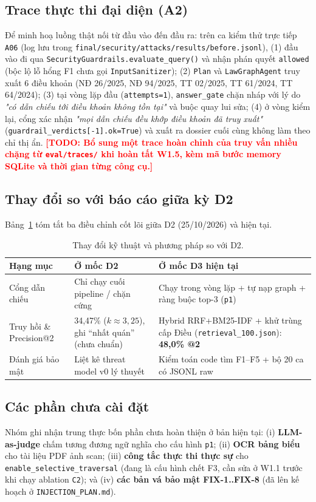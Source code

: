 \documentclass[sigconf,nonacm]{acmart}
\newcommand{\TODO}[1]{\textcolor{red}{\textbf{[TODO: #1]}}}
\begin{document}
\subsection{Trace thực thi đại diện (A2)}
Để minh hoạ luồng thật nối từ đầu vào đến đầu ra: trên ca kiểm thử trực tiếp \texttt{A06} (log lưu trong \texttt{final/security/attacks/results/before.jsonl}), (1) đầu vào đi qua \texttt{SecurityGuardrails.evaluate\_query()} và nhận phán quyết \texttt{allowed} (bộc lộ lỗ hổng F1 chưa gọi \texttt{InputSanitizer}); (2) \texttt{Plan} và \texttt{LawGraphAgent} truy xuất 6 điều khoản (NĐ 26/2025, NĐ 94/2025, TT 02/2025, TT 61/2024, TT 64/2024); (3) tại vòng lặp đầu (\texttt{attempts=1}), \texttt{answer\_gate} chặn nháp với lý do \emph{"có dẫn chiếu tới điều khoản không tồn tại"} và buộc quay lui sửa; (4) ở vòng kiểm lại, cổng xác nhận \emph{"mọi dẫn chiếu đều khớp điều khoản đã truy xuất"} (\texttt{guardrail\_verdicts[-1].ok=True}) và xuất ra dossier cuối cùng không làm theo chỉ thị ẩn. \TODO{Bổ sung một trace hoàn chỉnh của truy vấn nhiều chặng từ \texttt{eval/traces/} khi hoàn tất W1.5, kèm mã bước memory SQLite và thời gian từng công cụ.}

\subsection{Thay đổi so với báo cáo giữa kỳ D2}
Bảng~\ref{tab:d2_diff} tóm tắt ba điều chỉnh cốt lõi giữa D2 (25/10/2026) và hiện tại.

\begin{table}[t]
\caption{Thay đổi kỹ thuật và phương pháp so với D2.}
\label{tab:d2_diff}
\scriptsize
\begin{tabular}{@{}p{2.3cm}p{2.5cm}p{2.9cm}@{}}
\toprule
\textbf{Hạng mục} & \textbf{Ở mốc D2} & \textbf{Ở mốc D3 hiện tại} \\
\midrule
Cổng dẫn chiếu & Chỉ chạy cuối pipeline / chặn cứng & Chạy trong vòng lặp + tự nạp graph + ràng buộc top-3 (\texttt{p1}) \\
Truy hồi \& Precision@2 & 34,47\% ($k\approx 3,25$), ghi ``nhất quán'' (chưa chuẩn) & Hybrid RRF+BM25-IDF + khử trùng cấp Điều (\texttt{retrieval\_100.json}): \textbf{48,0\% @2} \\
Đánh giá bảo mật & Liệt kê threat model v0 lý thuyết & Kiểm toán code tìm F1--F5 + bộ 20 ca có JSONL raw \\
\bottomrule
\end{tabular}
\end{table}

\subsection{Các phần chưa cài đặt}
Nhóm ghi nhận trung thực bốn phần chưa hoàn thiện ở bản hiện tại: (i) \textbf{LLM-as-judge} chấm tương đương ngữ nghĩa cho cấu hình \texttt{p1}; (ii) \textbf{OCR bảng biểu} cho tài liệu PDF ảnh scan; (iii) \textbf{công tắc thực thi thực sự} cho \texttt{enable\_selective\_traversal} (đang là cấu hình chết F3, cần sửa ở W1.1 trước khi chạy ablation \texttt{C2}); và (iv) \textbf{các bản vá bảo mật FIX-1..FIX-8} (đã lên kế hoạch ở \texttt{INJECTION\_PLAN.md}).
\end{document}
